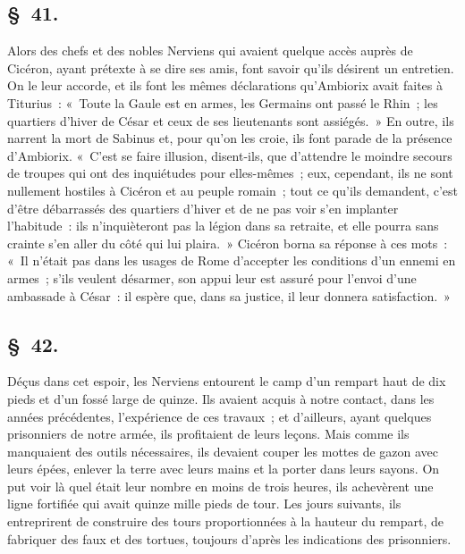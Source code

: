 \documentclass[french,twoside]{book} %
\begin{document}
\subsection[{§ 41.}]{ \textsc{§ 41.} }
\noindent Alors des chefs et des nobles Nerviens qui avaient quelque accès auprès de Cicéron, ayant prétexte à se dire ses amis, font savoir qu’ils désirent un entretien. On le leur accorde, et ils font les mêmes déclarations qu’Ambiorix avait faites à Titurius : « Toute la Gaule est en armes, les Germains ont passé le Rhin ; les quartiers d’hiver de César et ceux de ses lieutenants sont assiégés. » En outre, ils narrent la mort de Sabinus et, pour qu’on les croie, ils font parade de la présence d’Ambiorix. « C'est se faire illusion, disent-ils, que d’attendre le moindre secours de troupes qui ont des inquiétudes pour elles-mêmes ; eux, cependant, ils ne sont nullement hostiles à Cicéron et au peuple romain ; tout ce qu’ils demandent, c’est d’être débarrassés des quartiers d’hiver et de ne pas voir s’en implanter l’habitude : ils n’inquièteront pas la légion dans sa retraite, et elle pourra sans crainte s’en aller du côté qui lui plaira. » Cicéron borna sa réponse à ces mots : « Il n’était pas dans les usages de Rome d’accepter les conditions d’un ennemi en armes ; s’ils veulent désarmer, son appui leur est assuré pour l’envoi d’une ambassade à César : il espère que, dans sa justice, il leur donnera satisfaction. »
\subsection[{§ 42.}]{ \textsc{§ 42.} }
\noindent Déçus dans cet espoir, les Nerviens entourent le camp d’un rempart haut de dix pieds et d’un fossé large de quinze. Ils avaient acquis à notre contact, dans les années précédentes, l’expérience de ces travaux ; et d’ailleurs, ayant quelques prisonniers de notre armée, ils profitaient de leurs leçons. Mais comme ils manquaient des outils nécessaires, ils devaient couper les mottes de gazon avec leurs épées, enlever la terre avec leurs mains et la porter dans leurs sayons. On put voir là quel était leur nombre en moins de trois heures, ils achevèrent une ligne fortifiée qui avait quinze mille pieds de tour. Les jours suivants, ils entreprirent de construire des tours proportionnées à la hauteur du rempart, de fabriquer des faux et des tortues, toujours d’après les indications des prisonniers.
\end{document}
